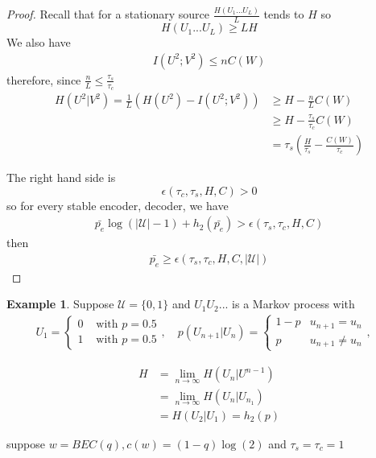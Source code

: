 \documentclass{article}
\theoremstyle{definition} %
\newtheorem{example}{Example}
\def\U{\mathcal{U}}
\begin{document}
\begin{proof}
  Recall that for a stationary source $\frac{H(U_1 ... U_L)}{L}$ tends to $H$ so
  $$ H(U_1 ... U_L) \geq L H$$
  We also have
  \begin{align*}
    I(U^2; V^2) \leq n C(W)
  \end{align*}
  therefore, since $\frac{n}{L} \leq \frac{\tau_s}{\tau_c}$
  \begin{align*}
    H(U^2 | V^2) = \frac{1}{L} (H(U^2) - I(U^2; V^2)) &\geq H - \frac{n}{L} C(W) \\
    &\geq H - \frac{\tau_s}{\tau_c} C(W) \\
    &= \tau_s (\frac{H}{\tau_s} - \frac{C(W)}{\tau_c})
  \end{align*}

  The right hand side is
  $$\epsilon(\tau_c, \tau_s, H, C) > 0$$
  so for every stable encoder, decoder, we have
  \begin{align*}
    \bar{p_e} \log(|\U| - 1) + h_2(\bar{p_e}) > \epsilon(\tau_s, \tau_c, H, C)
  \end{align*}
  then
  \begin{align*}
    \bar{p_e} \geq \epsilon(\tau_s, \tau_c, H, C, |\U|)
  \end{align*}
\end{proof}

\begin{example}
  Suppose $\U = \{ 0, 1 \}$ and $U_1 U_2 ...$ is a Markov process with
    \begin{align*}
    U_1 =
    \left\{
    \begin{array}{ll}
      0 & \text{ with } p = 0.5 \\
      1 & \text{ with } p = 0.5
    \end{array}
    \right. , \quad
    p(U_{n+1} | U_n) =
    \left\{
    \begin{array}{ll}
      1 - p & u_{n+1} = u_n \\
      p     & u_{n+1} \neq u_n
    \end{array}
    \right. , \quad
  \end{align*}
\end{example}

\begin{align*}
  H &= \lim_{n \to \infty} H(U_n | U^{n-1})\\
    &= \lim_{n \to \infty} H(U_n | U_{n_1})\\
    &= H(U_2 | U_1) = h_2(p)
\end{align*}

suppose $w = BEC(q), c(w) = (1 - q)\log(2)$ and $\tau_s = \tau_c = 1$
\end{document}
